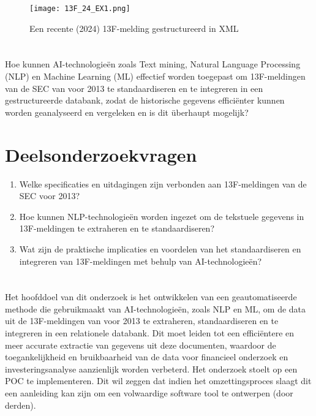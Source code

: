 \begin{figure}[hbt!]
    \texttt{[image: 13F\_24\_EX1.png]}
    \caption[13F voorbeeld 7]{\label{fig:voorbeeld na 2013 - inleiding}Een recente (2024) 13F-melding gestructureerd in XML}
\end{figure}
\section{}%
\label{sec:onderzoeksvraag}

Hoe kunnen AI-technologieën zoals Text mining, Natural Language Processing (NLP) en Machine Learning (ML) effectief worden toegepast om 13F-meldingen van de SEC van voor 2013 te standaardiseren en te integreren in een gestructureerde databank, zodat de historische gegevens efficiënter kunnen worden geanalyseerd en vergeleken en is dit überhaupt mogelijk?

\section{Deelsonderzoekvragen}
\begin{enumerate}
    \item Welke specificaties en uitdagingen zijn verbonden aan 13F-meldingen van de SEC voor 2013?
    \item Hoe kunnen NLP-technologieën worden ingezet om de tekstuele gegevens in 13F-meldingen te extraheren en te standaardiseren?
    \item Wat zijn de praktische implicaties en voordelen van het standaardiseren en integreren van 13F-meldingen met behulp van AI-technologieën?
    
\end{enumerate}
\section{}%
\label{sec:onderzoeksdoelstelling}

Het hoofddoel van dit onderzoek is het ontwikkelen van een geautomatiseerde methode die gebruikmaakt van AI-technologieën, zoals NLP en ML, om de data uit de 13F-meldingen van voor 2013 te extraheren, standaardiseren en te integreren in een relationele databank. Dit moet leiden tot een efficiëntere en meer accurate extractie van gegevens uit deze documenten, waardoor de toegankelijkheid en bruikbaarheid van de data voor financieel onderzoek en investeringsanalyse aanzienlijk worden verbeterd. 
Het onderzoek stoelt op een POC te implementeren. Dit wil zeggen dat indien het omzettingsproces slaagt dit een aanleiding kan zijn om een volwaardige software tool te ontwerpen (door derden).


